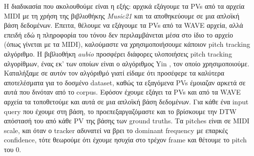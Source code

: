 Η διαδικασία που ακολουθούμε είναι η εξής: αρχικά εξάγουμε τα PVs από τα αρχεία MIDI με τη χρήση της βιβλιοθήκης \emph{Music21}
\cite{music21} και τα αποθηκεύουμε σε μια απλοϊκή βάση δεδομένων. Έπειτα, θέλουμε να εξάγουμε τα PVs από τα WAVE αρχεία, αλλά επειδή εδώ η
πληροφορία του τόνου δεν περιλαμβάνεται μέσα στο ίδιο το αρχείο (όπως γίνεται με τα MIDI), καλούμαστε να χρησιμοποιήσουμε κάποιον pitch
tracking αλγόριθμο. Η βιβλιοθήκη \emph{aubio} \cite{aubio} προσφέρει διάφορες υλοποιήσεις pitch tracking αλγορίθμων, ένας εκ' των οποίων
είναι ο αλγόριθμος Yin \cite{de2002yin}, τον οποίο χρησιμοποιούμε. Καταλήξαμε σε αυτόν τον αλγόριθμό γιατί είδαμε ότι προσέφερε τα καλύτερα
αποτελέσματα για το δοσμένο dataset, καθώς τα εξαγόμενα PVs έμοιαζαν αρκετά σε αυτά που δινόταν από το corpus. Εφόσον έχουμε εξάγει τα PVs
και από τα WAVE αρχεία τα τοποθετούμε και αυτά σε μια απλοϊκή βάση δεδομένων. Για κάθε ένα input query που έχουμε στη βάση, το
προεπεξαργαζόμαστε και το βρίσκουμε την DTW απόστασή του από κάθε PV της βάσης των ground truths. Τα pitches είναι σε MIDI scale, και όταν
ο tracker αδυνατεί να βρει το dominant frequency με επαρκές confidence, τότε θεωρούμε ότι έχουμε ησυχία στο τρέχον frame και θέτουμε το
pitch του 0.

